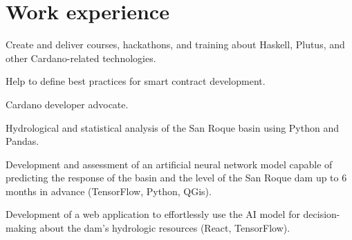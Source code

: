 \documentclass[]{robertino-cv}
\begin{document}
%
%
\lastupdated

%
%

%
%
\begin{minipage}[t]{0.48\textwidth} 


\section{Work experience} 

\begin{tightemize}
\vspace{\topsep} %
\item Create and deliver courses, hackathons, and training about Haskell, Plutus, and other Cardano-related technologies.
\item Help to define best practices for smart contract development. 
\item Cardano developer advocate.
\end{tightemize}
\sectionsep

\begin{tightemize}
\item Hydrological and statistical analysis of the San Roque basin using Python and Pandas.
\item Development and assessment of an artificial neural network model capable of predicting the response of the basin and the level of the San Roque dam up to 6 months in advance (TensorFlow, Python, QGis).
\item Development of a web application to effortlessly use the AI model for decision-making about the dam's hydrologic resources (React, TensorFlow).
\end{tightemize}
\sectionsep


\end{minipage}
\end{document}
